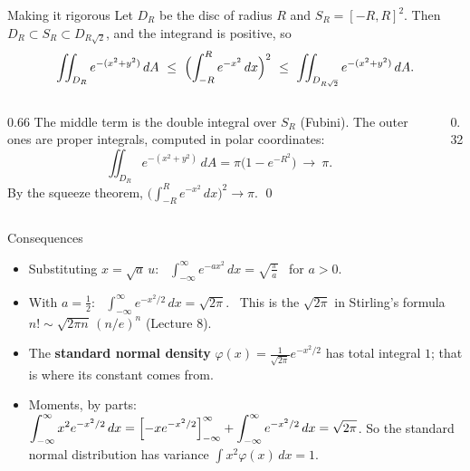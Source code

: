 \documentclass[10pt]{wosm-slides}
\newcommand{\dA}{\, dA}
\begin{document}
\begin{frame}{Making it rigorous}
  Let $D_R$ be the disc of radius $R$ and $S_R = [-R, R]^2$. Then $D_R \subset S_R \subset D_{R\sqrt2}$, and
  the integrand is positive, so
  \[ \iint_{D_R} e^{-(x^2 + y^2)} \dA \ \le \ \Bigl(\int_{-R}^R e^{-x^2}\, dx\Bigr)^2
     \ \le \ \iint_{D_{R\sqrt2}} e^{-(x^2 + y^2)} \dA . \]
  \begin{columns}[c]
    \begin{column}{0.66\textwidth}
      \pause
      The middle term is the double integral over $S_R$ (Fubini). The outer ones are proper
      integrals, computed in polar coordinates:
      \[ \iint_{D_R} e^{-(x^2 + y^2)} \dA = \pi\bigl(1 - e^{-R^2}\bigr) \ \to\ \pi . \]
      \pause
      By the squeeze theorem, $\bigl(\int_{-R}^R e^{-x^2}\, dx\bigr)^2 \to \pi$. \qed
    \end{column}
    \begin{column}{0.32\textwidth}
      \centering
    \end{column}
  \end{columns}
\end{frame}

\begin{frame}{Consequences}
  \begin{itemize}
    \item Substituting $x = \sqrt a\, u$: \ $\displaystyle \int_{-\infty}^\infty e^{-a x^2}\, dx = \sqrt{\frac\pi a}$ \ for $a > 0$.
    \item With $a = \frac12$: \ $\displaystyle \int_{-\infty}^\infty e^{-x^2/2}\, dx = \sqrt{2\pi}$. \ This is the
      $\sqrt{2\pi}$ in Stirling's formula $n! \sim \sqrt{2\pi n}\,(n/e)^n$ (Lecture 8).
    \pause
    \item The \textbf{standard normal density} $\varphi(x) = \frac{1}{\sqrt{2\pi}} e^{-x^2/2}$ has total
      integral $1$; that is where its constant comes from.
    \pause
    \item Moments, by parts: $\displaystyle \int_{-\infty}^\infty x^2 e^{-x^2/2}\, dx
      = \Bigl[-x e^{-x^2/2}\Bigr]_{-\infty}^\infty + \int_{-\infty}^\infty e^{-x^2/2}\, dx = \sqrt{2\pi}$.
      So the standard normal distribution has variance $\int x^2 \varphi(x)\, dx = 1$.
  \end{itemize}
\end{frame}
\end{document}
